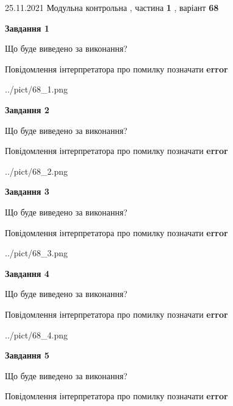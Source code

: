 \documentclass[10pt, ukrainian]{article}
\begin{document}
{25.11.2021 Модульна контрольна , частина \textbf { 1 }, варіант  \No \textbf { 68 }\par}
{
\begin {large}

{\begin {center}\textbf{Завдання 1}\end {center}}\par
Що буде виведено за виконання? \par
Повідомлення інтерпретатора про помилку позначати \textbf{error}

\begin{center}
	{../pict/68_1.png}
\end{center}
\newpage

{\begin {center}\textbf{Завдання 2}\end {center}}\par
Що буде виведено за виконання? \par
Повідомлення інтерпретатора про помилку позначати \textbf{error}

\begin{center}
	{../pict/68_2.png}
\end{center}
\newpage

{\begin {center}\textbf{Завдання 3}\end {center}}\par
Що буде виведено за виконання? \par
Повідомлення інтерпретатора про помилку позначати \textbf{error}

\begin{center}
	{../pict/68_3.png}
\end{center}
\newpage

{\begin {center}\textbf{Завдання 4}\end {center}}\par
Що буде виведено за виконання? \par
Повідомлення інтерпретатора про помилку позначати \textbf{error}

\begin{center}
	{../pict/68_4.png}
\end{center}
\newpage

{\begin {center}\textbf{Завдання 5}\end {center}}\par
Що буде виведено за виконання? \par
Повідомлення інтерпретатора про помилку позначати \textbf{error}


\end{large}}
\end{document}
